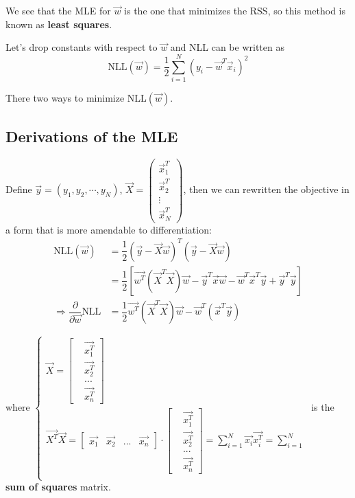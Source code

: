 We see that the MLE for $\vec{w}$ is the one that minimizes the RSS, so this method is known as \textbf{least squares}.

Let's drop constants with respect to $\vec{w}$ and NLL can be written as
\begin{equation}
\text{NLL}(\vec{w}) = \dfrac{1}{2}\sum\limits_{i=1}^N (y_i-\vec{w}^T\vec{x}_i)^2
\end{equation}

There two ways to minimize NLL$(\vec{w})$.


\subsection{Derivations of the MLE}
Define $\vec{y}=(y_1,y_2,\cdots,y_N)$, $\vec{X}=\left(\begin{array}{c}\vec{x}_1^T \\ \vec{x}_2^T \\ \vdots \\ \vec{x}_N^T\end{array}\right)$, then we can rewritten the objective in a form that is more amendable to differentiation:
\begin{align}
\text{NLL}(\vec{w}) &= \dfrac{1}{2}(\vec{y}-\vec{X}\vec{w})^T(\vec{y}-\vec{X}\vec{w})\\
&= \dfrac{1}{2} [\vec{w^T} (\vec{X}^T\vec{X})\vec{w} - \vec{y}^T\vec{x}\vec{w}- \vec{w}^T\vec{x}^T\vec{y}  +\vec{y}^T\vec{y}]			\\
\Rightarrow
\dfrac{\partial}{\partial \vec{w}}\text{NLL} &= \dfrac{1}{2} \vec{w^T} (\vec{X}^T\vec{X})\vec{w} -\vec{w}^T(\vec{x}^T\vec{y}) 
\end{align}

where
$\begin{cases}
\vec{X} = \begin{bmatrix}
&\vec{x_1^T} \\
&\vec{x_2^T} \\
& ... \\
&\vec{x_n^T}
\end{bmatrix}\\	
\vec{X^T}\vec{X} =
\begin{bmatrix}
\vec{x_1} & \vec{x_2} & ...&\vec{x_n}
\end{bmatrix} 
\cdot
\begin{bmatrix}
&\vec{x_1^T} \\
&\vec{x_2^T} \\
& ... \\
&\vec{x_n^T}
\end{bmatrix}  = \sum\limits_{i=1}^{N}\vec{x_i}\vec{x_i^T} = \sum\limits_{i=1}^{N} \\
\end{cases}$
is the \textbf{sum of squares } matrix.

